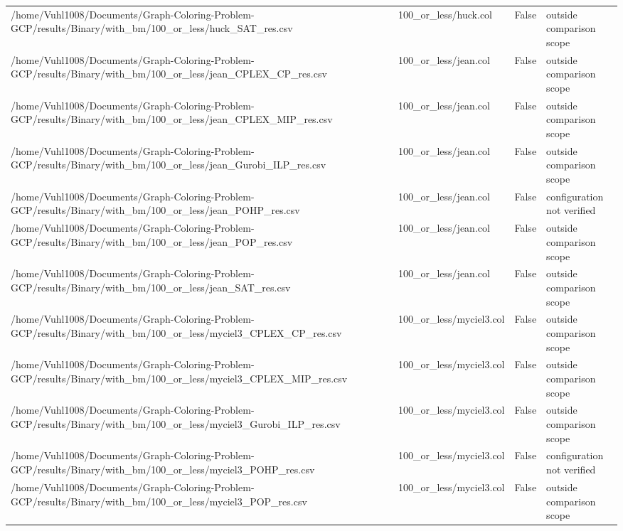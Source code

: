 \begin{table}[htbp]
\begin{tabular}{llll}
/home/Vuhl1008/Documents/Graph-Coloring-Problem-GCP/results/Binary/with\_bm/100\_or\_less/huck\_SAT\_res.csv & 100\_or\_less/huck.col & False & outside comparison scope \\
/home/Vuhl1008/Documents/Graph-Coloring-Problem-GCP/results/Binary/with\_bm/100\_or\_less/jean\_CPLEX\_CP\_res.csv & 100\_or\_less/jean.col & False & outside comparison scope \\
/home/Vuhl1008/Documents/Graph-Coloring-Problem-GCP/results/Binary/with\_bm/100\_or\_less/jean\_CPLEX\_MIP\_res.csv & 100\_or\_less/jean.col & False & outside comparison scope \\
/home/Vuhl1008/Documents/Graph-Coloring-Problem-GCP/results/Binary/with\_bm/100\_or\_less/jean\_Gurobi\_ILP\_res.csv & 100\_or\_less/jean.col & False & outside comparison scope \\
/home/Vuhl1008/Documents/Graph-Coloring-Problem-GCP/results/Binary/with\_bm/100\_or\_less/jean\_POHP\_res.csv & 100\_or\_less/jean.col & False & configuration not verified \\
/home/Vuhl1008/Documents/Graph-Coloring-Problem-GCP/results/Binary/with\_bm/100\_or\_less/jean\_POP\_res.csv & 100\_or\_less/jean.col & False & outside comparison scope \\
/home/Vuhl1008/Documents/Graph-Coloring-Problem-GCP/results/Binary/with\_bm/100\_or\_less/jean\_SAT\_res.csv & 100\_or\_less/jean.col & False & outside comparison scope \\
/home/Vuhl1008/Documents/Graph-Coloring-Problem-GCP/results/Binary/with\_bm/100\_or\_less/myciel3\_CPLEX\_CP\_res.csv & 100\_or\_less/myciel3.col & False & outside comparison scope \\
/home/Vuhl1008/Documents/Graph-Coloring-Problem-GCP/results/Binary/with\_bm/100\_or\_less/myciel3\_CPLEX\_MIP\_res.csv & 100\_or\_less/myciel3.col & False & outside comparison scope \\
/home/Vuhl1008/Documents/Graph-Coloring-Problem-GCP/results/Binary/with\_bm/100\_or\_less/myciel3\_Gurobi\_ILP\_res.csv & 100\_or\_less/myciel3.col & False & outside comparison scope \\
/home/Vuhl1008/Documents/Graph-Coloring-Problem-GCP/results/Binary/with\_bm/100\_or\_less/myciel3\_POHP\_res.csv & 100\_or\_less/myciel3.col & False & configuration not verified \\
/home/Vuhl1008/Documents/Graph-Coloring-Problem-GCP/results/Binary/with\_bm/100\_or\_less/myciel3\_POP\_res.csv & 100\_or\_less/myciel3.col & False & outside comparison scope \\

\end{tabular}
\end{table}
